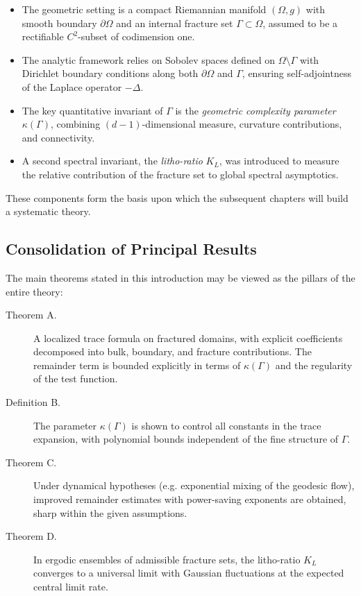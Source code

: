 \begin{itemize}
    \item The geometric setting is a compact Riemannian manifold $(\Omega,g)$
    with smooth boundary $\partial\Omega$ and an internal fracture set
    $\Gamma \subset \Omega$, assumed to be a rectifiable $C^2$-subset of
    codimension one.
    \item The analytic framework relies on Sobolev spaces defined on
    $\Omega\setminus\Gamma$ with Dirichlet boundary conditions along
    both $\partial\Omega$ and $\Gamma$, ensuring self-adjointness of the
    Laplace operator $-\Delta$.
    \item The key quantitative invariant of $\Gamma$ is the
    \emph{geometric complexity parameter} $\kappa(\Gamma)$, combining
    $(d-1)$-dimensional measure, curvature contributions, and connectivity.
    \item A second spectral invariant, the \emph{litho-ratio} $K_L$,
    was introduced to measure the relative contribution of the fracture set
    to global spectral asymptotics.
\end{itemize}

These components form the basis upon which the subsequent chapters will build
a systematic theory.

\subsection{Consolidation of Principal Results}
The main theorems stated in this introduction may be viewed as the pillars of
the entire theory:

\begin{description}
    \item[Theorem A.] A localized trace formula on fractured domains, with
    explicit coefficients decomposed into bulk, boundary, and fracture
    contributions. The remainder term is bounded explicitly in terms of
    $\kappa(\Gamma)$ and the regularity of the test function.
    \item[Definition B.] The parameter $\kappa(\Gamma)$ is shown to control all
    constants in the trace expansion, with polynomial bounds independent of
    the fine structure of $\Gamma$.
    \item[Theorem C.] Under dynamical hypotheses (e.g. exponential mixing of the
    geodesic flow), improved remainder estimates with power-saving exponents
    are obtained, sharp within the given assumptions.
    \item[Theorem D.] In ergodic ensembles of admissible fracture sets, the
    litho-ratio $K_L$ converges to a universal limit with Gaussian fluctuations
    at the expected central limit rate.
\end{description}

